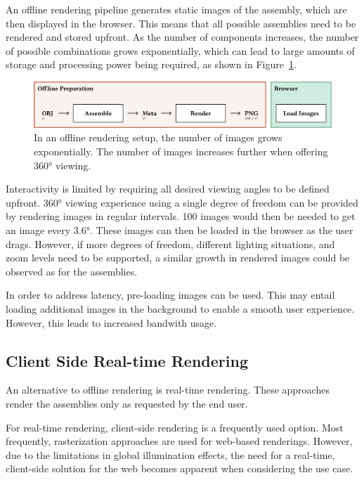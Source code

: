 An offline rendering pipeline generates static images of the assembly, which are then displayed in the browser. This means that all possible assemblies need to be rendered and stored upfront. As the number of components increases, the number of possible combinations grows exponentially, which can lead to large amounts of storage and processing power being required, as shown in Figure~\ref{fig:cad-offline}.

\begin{figure}[H]
  \includegraphics[width=\columnwidth]{resources/cad-pipeline-offline.png}
  \caption{In an offline rendering setup, the number of images grows exponentially. The number of images increases further when offering 360° viewing.}
  \label{fig:cad-offline}
\end{figure}

Interactivity is limited by requiring all desired viewing angles to be defined upfront. 360° viewing experience using a single degree of freedom can be provided by rendering images in regular intervals. 100 images would then be needed to get an image every 3.6°. These images can then be loaded in the browser as the user drags. However, if more degrees of freedom, different lighting situations, and zoom levels need to be supported, a similar growth in rendered images could be observed as for the assemblies.

In order to address latency, pre-loading images can be used. This may entail loading additional images in the background to enable a smooth user experience. However, this leads to increased bandwith usage.

\subsection*{Client Side Real-time Rendering}

An alternative to offline rendering is real-time rendering. These approaches render the assemblies only as requested by the end user.

For real-time rendering, client-side rendering is a frequently  used option. Most frequently, rasterization approaches are used for web-based renderings. However, due to the limitations in global illumination effects, the need for a real-time, client-side solution for the web becomes apparent when considering the use case.

